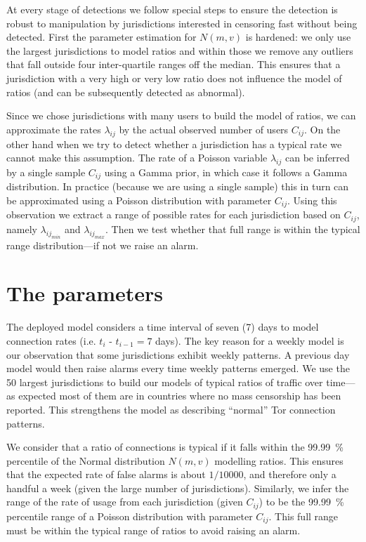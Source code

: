 \documentclass{article}
\begin{document}
At every stage of detections we follow special steps to ensure the
detection is robust to manipulation by jurisdictions interested in
censoring fast without being detected.
First the parameter estimation for $N(m,v)$ is hardened: we only use the
largest jurisdictions to model ratios and within those we remove any
outliers that fall outside four inter-quartile ranges off the median.
This ensures that a jurisdiction with a very high or very low ratio does
not influence the model of ratios (and can be subsequently detected as
abnormal).

Since we chose jurisdictions with many users to build the model of ratios,
we can approximate the rates $\lambda_{ij}$ by the actual observed number
of users $C_{ij}$.
On the other hand when we try to detect whether a jurisdiction has a
typical rate we cannot make this assumption.
The rate of a Poisson variable $\lambda_{ij}$ can be inferred by a single
sample $C_{ij}$ using a Gamma prior, in which case it follows a Gamma
distribution.
In practice (because we are using a single sample) this in turn can be
approximated using a Poisson distribution with parameter $C_{ij}$.
Using this observation we extract a range of possible rates for each
jurisdiction based on $C_{ij}$, namely $\lambda_{ij_{min}}$ and
$\lambda_{ij_{max}}$.
Then we test whether that full range is within the typical range
distribution---if not we raise an alarm.

\section{The parameters}

The deployed model considers a time interval of seven (7) days to model
connection rates (i.e. $t_i$ - $t_{i-1} = 7$ days).
The key reason for a weekly model is our observation that some
jurisdictions exhibit weekly patterns.
A previous day model would then raise alarms every time weekly patterns
emerged.
We use the 50 largest jurisdictions to build our models of typical ratios
of traffic over time---as expected most of them are in countries where no
mass censorship has been reported.
This strengthens the model as describing ``normal'' Tor connection
patterns.

We consider that a ratio of connections is typical if it falls within the
99.99~\% percentile of the Normal distribution $N(m,v)$ modelling ratios.
This ensures that the expected rate of false alarms is about $1 / 10000$,
and therefore only a handful a week (given the large number of
jurisdictions).
Similarly, we infer the range of the rate of usage from each jurisdiction
(given $C_{ij}$) to be the 99.99~\% percentile range of a Poisson
distribution with parameter $C_{ij}$.
This full range must be within the typical range of ratios to avoid
raising an alarm.
\end{document}
